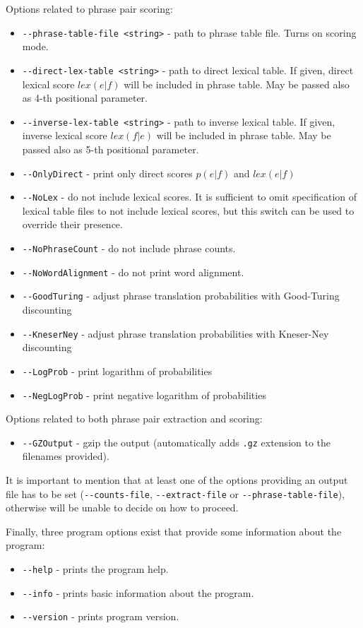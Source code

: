 Options related to phrase pair scoring:
\begin{itemize}
 \item \verb|--phrase-table-file <string>| - path to phrase table file.
  Turns on scoring mode.
 \item \verb|--direct-lex-table <string>| - path to direct lexical table.
  If given, direct lexical score $lex(e|f)$ will be included in phrase table.
  May be passed also as 4-th positional parameter.
 \item \verb|--inverse-lex-table <string>| - path to inverse lexical table.
  If given, inverse lexical score $lex(f|e)$ will be included in phrase table.
  May be passed also as 5-th positional parameter.
 \item \verb|--OnlyDirect| - print only direct scores $p(e|f)$ and $lex(e|f)$
 \item \verb|--NoLex| - do not include lexical scores.
  It is sufficient to omit specification of lexical table files to not
  include lexical scores, but this switch can be used to override their presence.
 \item \verb|--NoPhraseCount| - do not include phrase counts.  
 \item \verb|--NoWordAlignment| - do not print word alignment.
 \item \verb|--GoodTuring| - adjust phrase translation probabilities with
  Good-Turing discounting
 \item \verb|--KneserNey| - adjust phrase translation probabilities with
  Kneser-Ney discounting
 \item \verb|--LogProb| - print logarithm of probabilities
 \item \verb|--NegLogProb| - print negative logarithm of probabilities
\end{itemize}

Options related to both phrase pair extraction and scoring:
\begin{itemize}
 \item \verb|--GZOutput| - gzip the output (automatically
  adds \texttt{.gz} extension to the filenames provided).
\end{itemize}

It is important to mention that at least one of the options providing an output
file has to be set (\verb|--counts-file|, \verb|--extract-file| or \verb|--phrase-table-file|),
otherwise \eppex{} will be unable to decide on how to proceed.

Finally, three program options exist that provide some information about the program:
\begin{itemize}
 \item \verb|--help| - prints the program help.
 \item \verb|--info| - prints basic information about the program.
 \item \verb|--version| - prints program version.
\end{itemize}

